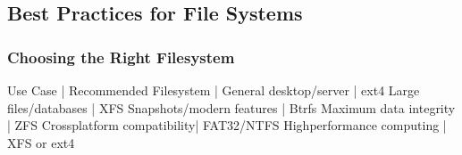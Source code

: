 \documentclass[letterpaper,10pt,english]{sphinxmanual}
\begin{document}
\subsection{Best Practices for File Systems}
\label{\detokenize{file-systems:best-practices-for-file-systems}}

\subsubsection{Choosing the Right Filesystem}
\label{\detokenize{file-systems:choosing-the-right-filesystem}}
\sphinxAtStartPar
{}

\begin{sphinxVerbatim}[commandchars=\\\{\}]
Use Case                    | Recommended Filesystem
\PYGZhy{}\PYGZhy{}\PYGZhy{}\PYGZhy{}\PYGZhy{}\PYGZhy{}\PYGZhy{}\PYGZhy{}\PYGZhy{}\PYGZhy{}\PYGZhy{}\PYGZhy{}\PYGZhy{}\PYGZhy{}\PYGZhy{}\PYGZhy{}\PYGZhy{}\PYGZhy{}\PYGZhy{}\PYGZhy{}\PYGZhy{}\PYGZhy{}\PYGZhy{}\PYGZhy{}\PYGZhy{}\PYGZhy{}\PYGZhy{}\PYGZhy{}|\PYGZhy{}\PYGZhy{}\PYGZhy{}\PYGZhy{}\PYGZhy{}\PYGZhy{}\PYGZhy{}\PYGZhy{}\PYGZhy{}\PYGZhy{}\PYGZhy{}\PYGZhy{}\PYGZhy{}\PYGZhy{}\PYGZhy{}\PYGZhy{}\PYGZhy{}\PYGZhy{}\PYGZhy{}\PYGZhy{}\PYGZhy{}\PYGZhy{}
General desktop/server      | ext4
Large files/databases       | XFS
Snapshots/modern features   | Btrfs
Maximum data integrity      | ZFS
Cross\PYGZhy{}platform compatibility| FAT32/NTFS
High\PYGZhy{}performance computing  | XFS or ext4
\end{sphinxVerbatim}
\end{document}
